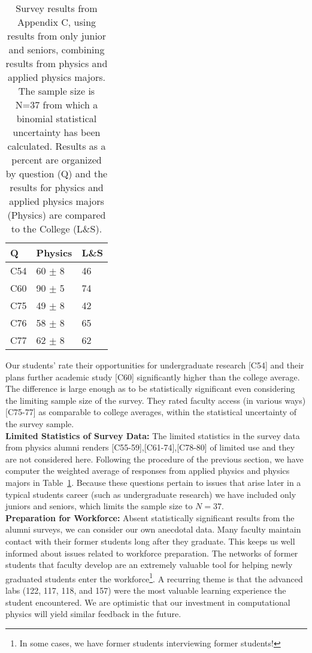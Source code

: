 \documentclass[12pt]{article}
\begin{document}
\begin{table}[htbp]
\caption{\label{tbl:appcii} Survey results from Appendix C, using
  results from only junior and seniors, combining results from physics
  and applied physics majors. The sample size is N=37 from which a
  binomial statistical uncertainty has been calculated.  Results as a
  percent are organized by question (Q) and the results for physics
  and applied physics majors (Physics) are compared to the College
  (L\&S).}
\begin{center}
\begin{tabular}{|lll|}
\hline
Q & Physics & L\&S \\
\hline
C54 & 60 $\pm$ 8 & 46 \\ 
C60 & 90 $\pm$ 5 & 74 \\
C75 & 49 $\pm$ 8 & 42 \\ 
C76 & 58 $\pm$ 8 & 65 \\ 
C77 & 62 $\pm$ 8 & 62 \\ 
\hline 
\end{tabular}
\end{center}
\end{table}

\noindent
Our students' rate their opportunities for undergraduate research
[C54] and their plans further academic study [C60] significantly 
higher than the college average.  The difference is
large enough as to be statistically significant even considering the
limiting sample size of the survey.  They rated faculty access (in
various ways) [C75-77] as comparable to college averages, within the
statistical uncertainty of the survey sample.\\[3pt]

\noindent
{\bf Limited Statistics of Survey Data:} The limited statistics in the
survey data from physics alumni renders [C55-59],[C61-74],[C78-80] of
limited use and they are not considered here.  Following the procedure
of the previous section, we have computer the weighted average of
responses from applied physics and physics majors in
Table~\ref{tbl:appcii}.  Because these questions pertain to issues
that arise later in a typical students career (such as undergraduate
research) we have included only juniors and seniors, which limits the
sample size to $N=37$.\\[3pt]

\noindent
{\bf Preparation for Workforce:} Absent statistically significant
results from the alumni surveys, we can consider our own anecdotal
data.  Many faculty maintain contact with their former students long
after they graduate.  This keeps us well informed about issues related
to workforce preparation.  The networks of former students that
faculty develop are an extremely valuable tool for helping newly
graduated students enter the workforce\footnote{In some cases, we have
  former students interviewing former students!}.  A recurring theme
is that the advanced labs (122, 117, 118, and 157) were the most
valuable learning experience the student encountered.  We are
optimistic that our investment in computational physics will yield
similar feedback in the future.
\end{document}
